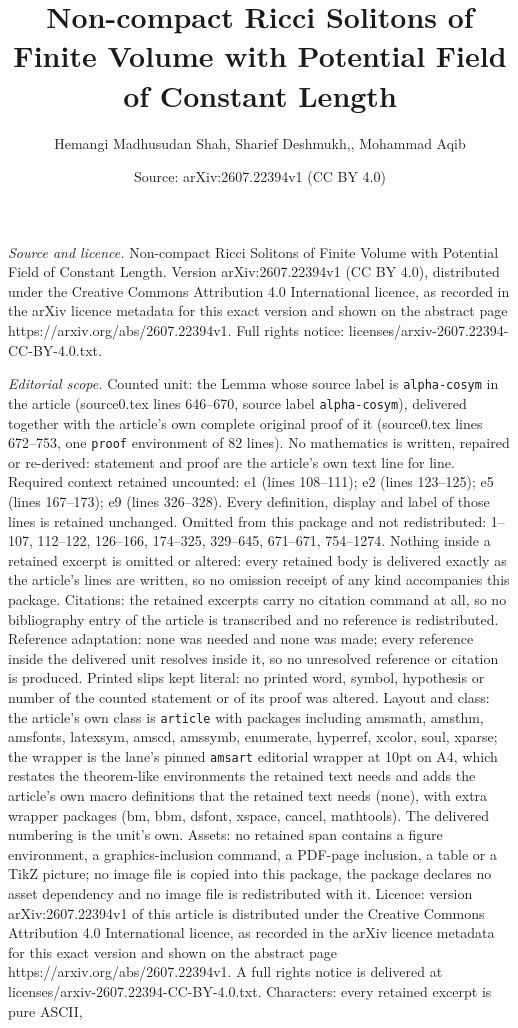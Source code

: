 \documentclass[10pt,a4paper]{amsart}
\title[Non-compact Ricci Solitons of Finite Volume with Potential F]{Non-compact Ricci Solitons of Finite Volume with Potential Field of Constant Length}
\author{Hemangi Madhusudan Shah, Sharief Deshmukh,, Mohammad Aqib}
\date{Source: arXiv:2607.22394v1 (CC BY 4.0)}
\begin{document}
\maketitle

\noindent\emph{Source and licence.} Non-compact Ricci Solitons of Finite Volume with Potential Field of Constant Length. Version arXiv:2607.22394v1 (CC BY 4.0), distributed under the Creative Commons Attribution 4.0 International licence, as recorded in the arXiv licence metadata for this exact version and shown on the abstract page https://arxiv.org/abs/2607.22394v1. Full rights notice: licenses/arxiv-2607.22394-CC-BY-4.0.txt.\par\smallskip

\noindent\textit{Editorial scope.} Counted unit: the Lemma whose source label is \texttt{alpha-cosym} in the article (source0.tex lines 646--670, source label \texttt{alpha-cosym}), delivered together with the article's own complete original proof of it (source0.tex lines 672--753, one \texttt{proof} environment of 82 lines). No mathematics is written, repaired or re-derived: statement and proof are the article's own text line for line. Required context retained uncounted: e1 (lines 108--111); e2 (lines 123--125); e5 (lines 167--173); e9 (lines 326--328). Every definition, display and label of those lines is retained unchanged. Omitted from this package and not redistributed: 1--107, 112--122, 126--166, 174--325, 329--645, 671--671, 754--1274. Nothing inside a retained excerpt is omitted or altered: every retained body is delivered exactly as the article's lines are written, so no omission receipt of any kind accompanies this package. Citations: the retained excerpts carry no citation command at all, so no bibliography entry of the article is transcribed and no reference is redistributed. Reference adaptation: none was needed and none was made; every reference inside the delivered unit resolves inside it, so no unresolved reference or citation is produced. Printed slips kept literal: no printed word, symbol, hypothesis or number of the counted statement or of its proof was altered. Layout and class: the article's own class is \texttt{article} with packages including amsmath, amsthm, amsfonts, latexsym, amscd, amssymb, enumerate, hyperref, xcolor, soul, xparse; the wrapper is the lane's pinned \texttt{amsart} editorial wrapper at 10pt on A4, which restates the theorem-like environments the retained text needs and adds the article's own macro definitions that the retained text needs (none), with extra wrapper packages (bm, bbm, dsfont, xspace, cancel, mathtools). The delivered numbering is the unit's own. Assets: no retained span contains a figure environment, a graphics-inclusion command, a PDF-page inclusion, a table or a TikZ picture; no image file is copied into this package, the package declares no asset dependency and no image file is redistributed with it. Licence: version arXiv:2607.22394v1 of this article is distributed under the Creative Commons Attribution 4.0 International licence, as recorded in the arXiv licence metadata for this exact version and shown on the abstract page https://arxiv.org/abs/2607.22394v1. A full rights notice is delivered at licenses/arxiv-2607.22394-CC-BY-4.0.txt. Characters: every retained excerpt is pure ASCII, 
\end{document}

